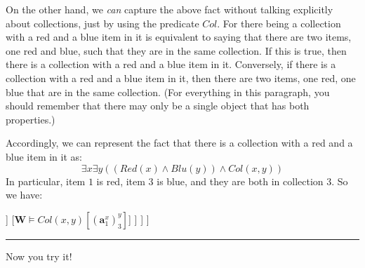 On the other hand, we \textit{can} capture the above fact without talking explicitly about collections, just by using the predicate $Col$. For there being a collection with a red and a blue item in it is equivalent to saying that there are two items, one red and blue, such that they are in the same collection. If this is true, then there is a collection with a red and a blue item in it. Conversely, if there is a collection with a red and a blue item in it, then there are two items, one red, one blue that are in the same collection. (For everything in this paragraph, you should remember that there may only be a single object that has both properties.)


\noindent Accordingly, we can represent the fact that there is a collection with a red and a blue item in it as:
\[
\exists x\exists y((Red(x) \wedge Blu(y)) \wedge Col(x, y))
\]
In particular, item $1$ is red, item $3$ is blue, and they are both in collection 3. So we have:

\begin{center}
\begin{forest}
	[{$\mathbf{W}\models \exists x\exists y((Red(x) \wedge Blu(y)) \wedge Col(x, y))[\mathbf{a}]$}
		[{$\mathbf{W}\models \exists y((Red(x) \wedge Blu(y)) \wedge Col(x, y))[\mathbf{a}^x_1]$}
		[{$\mathbf{W}\models (Red(x) \wedge Blu(y)) \wedge Col(x, y)[(\mathbf{a}^x_1)^y_3]$}
			[{$\mathbf{W}\models (Red(x) \wedge Blu(y)) [(\mathbf{a}^x_1)^y_3]$}
				[{$\mathbf{W}\models Red(x) [(\mathbf{a}^x_1)^y_3]$}]
				[{$\mathbf{W}\models Blu(y) [(\mathbf{a}^x_1)^y_3]$}]
			]
			[{$\mathbf{W}\models Col(x, y)[(\mathbf{a}^x_1)^y_3]$}]
		]
		]
	]
\end{forest}
\end{center}

\medskip\hrule\medskip

Now you try it!

